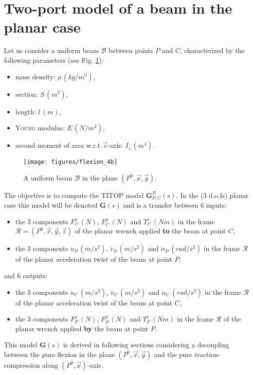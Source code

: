 \section{Two-port model of a beam in the planar case}\label{sect:2}
Let us consider a uniform beam $\mathcal{B}$ between points $P$ and $C$, characterized by the following parameters (see Fig. \ref{fig:flexion_4}):
\begin{itemize}
\item mass density: $\rho\,(kg/m^3)$,
\item section: $S\,(m^2)$,
\item length: $l\,(m)$,
\item \textsc{Young} modulus: $E\, (N/m^2)$,
\item second moment of area w.r.t $\vec{z}$-axis: $I_z\, (m^4)$.
\end{itemize}
\begin{figure}[htbp!]
  \texttt{[image: figures/flexion\_4b]}
\caption{A uniform beam $\mathcal{B}$ in the plane $(P^0,\vec{x},\vec{y})$.}
\label{fig:flexion_4} 
\end{figure}
The objective is to compute the TITOP model $\mathbf{G}_{P,C}^{\mathcal{B}}(s)$. In the ($3$ d.o.fs) planar case this model will be denoted $\mathbf{G}(s)$ and is a transfer between 6 inputs:
\begin{itemize}
\item the 3 components $F^x_{C}\,(N)$, $F^y_{C}\,(N)$ and $T^z_{C}\,(Nm)$ in the frame $\mathcal{R}=(P^0,\vec{x},\vec{y},\vec{z})$ of the planar wrench applied \textbf{to} the beam at point $C$,
\item the 3 components $\ddot{u}_{P}\,(m/s^2)$, $\ddot{v}_{P}\,(m/s^2)$ and $\ddot{\alpha}_{P}\,(rad/s^2)$ in the frame $\mathcal{R}$ of the planar acceleration twist of the beam at point $P$,
\end{itemize}
and 6 outputs:
\begin{itemize}
\item the 3 components $\ddot{u}_{C}\,(m/s^2)$, $\ddot{v}_{C}\,(m/s^2)$ and $\ddot{\alpha}_{C}\,(rad/s^2)$ in the frame $\mathcal{R}$ of the planar acceleration twist of the beam at point $C$,
\item the 3 components $F^x_{P}\,(N)$, $F^y_{P}\,(N)$ and $T^z_{P}\,(Nm)$ in the frame $\mathcal{R}$ of the planar wrench applied \textbf{by} the beam at point $P$.
\end{itemize}
This model $\mathbf{G}(s)$ is derived in following sections considering a decoupling between the pure flexion in the plane $(P^0,\vec{x},\vec{y})$ and the pure traction-compression along $(P^0,\vec{x})$-axis.

